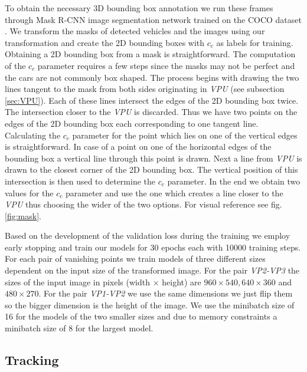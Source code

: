 \documentclass[twocolumn]{svjour3}          \smartqed  \usepackage{graphicx}
\begin{document}
To obtain the necessary 3D bounding box annotation we run these frames through Mask R-CNN \cite{MaskRCNN} image segmentation network trained on the COCO dataset \cite{COCO}. We transform the masks of detected vehicles and the images using our transformation and create the 2D bounding boxes with $c_c$ as labels for training. Obtaining a 2D bounding box from a mask is straightforward. The computation of the $c_c$ parameter requires a few steps since the masks may not be perfect and the cars are not commonly box shaped. The process begins with drawing the two lines tangent to the mask from both sides originating in \textit{VPU} (see subsection \ref{sec:VPU}). Each of these lines intersect the edges of the 2D bounding box twice. The intersection closer to the \textit{VPU} is discarded. Thus we have two points on the edges of the 2D bounding box each corresponding to one tangent line. Calculating the $c_c$ parameter for the point which lies on one of the vertical edges is straightforward. In case of a point on one of the horizontal edges of the bounding box a vertical line through this point is drawn. Next a line from \textit{VPU} is drawn to the closest corner of the 2D bounding box. The vertical position of this intersection is then used to determine the $c_c$ parameter. In the end we obtain two values for the $c_c$ parameter and use the one which creates a line closer to the \textit{VPU} thus choosing the wider of the two options. For visual reference see fig. \ref{fig:mask}.

\label{sec:variants}
Based on the development of the validation loss during the training we employ early stopping and train our models for 30 epochs each with 10000 training steps. For each pair of vanishing points we train models of three different sizes dependent on the input size of the transformed image. For the pair \textit{VP2-VP3} the sizes of the input image in pixels (width $\times$ height) are $960 \times 540, 640 \times 360$ and $480 \times 270$. For the pair \textit{VP1-VP2} we use the same dimensions we just flip them so the bigger dimension is the height of the image. We use the minibatch size of 16 for the models of the two smaller sizes and due to memory constraints a minibatch size of 8 for the largest model.

\subsection{Tracking}
\end{document}
